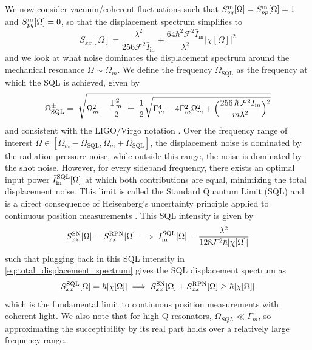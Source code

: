 We now consider vacuum/coherent fluctuations such that $S_{qq}^{\rm in}[\Omega]=S_{pp}^{\rm in}[\Omega]=1$ and $S_{pq}^{\rm in}[\Omega]=0$, so that the displacement spectrum simplifies to
\begin{equation}
  S_{xx}[\Omega] = \dfrac{\lambda^2}{256 \mathcal{F}^2 \bar{I}_\mathrm{in}} +  \dfrac{64 \hbar^2 \mathcal{F}^2 \bar{I}_\mathrm{in}}{\lambda^2}|\chi[\Omega]|^2 
  \label{eq:total_displacement_spectrum}
\end{equation}
and we look at what noise dominates the displacement spectrum around the mechanical resonance $\Omega \sim \Omega_m$. We define the frequency $\Omega_{\text{SQL}}$ as the frequency at which the SQL is achieved, given by
\begin{equation}
  \Omega^{\pm}_{\text{SQL}}  =\;\sqrt{\Omega_m^2-\dfrac{\Gamma_m^2}{2}
\;\pm\;\dfrac{1}{2}\sqrt{\Gamma_m^4-4\Gamma_m^2\Omega_m^2+\Big(\frac{256\,\hbar\,\mathcal F^2 I_{\rm in}}{m\lambda^2}\Big)^2}}
\end{equation}
and consistent with the LIGO/Virgo notation \cite{harry_advanced_2010, aasi_enhanced_2013}. Over the frequency range of interest $\Omega \in [\Omega_m - \Omega_{\text{SQL}}, \Omega_m + \Omega_{\text{SQL}}]$, the displacement noise is dominated by the radiation pressure noise, while outside this range, the noise is dominated by the shot noise. However, for every sideband frequency, there exists an optimal input power $\bar{I}_\mathrm{in}^{\rm SQL}[\Omega]$ at which both contributions are equal, minimizing the total displacement noise. This limit is called the Standard Quantum Limit (SQL) and is a direct consequence of Heisenberg's uncertainty principle applied to continuous position measurements \cite{braginsky_quantum_1992, clerk_introduction_2010}. This SQL intensity is given by
\begin{equation}
  S_{xx}^{\rm SN}[\Omega] = S_{xx}^{\rm RPN}[\Omega] \implies \bar{I}_\mathrm{in}^{\rm SQL}[\Omega] = \dfrac{\lambda^2}{128\mathcal{F}^2 \hbar |\chi[\Omega]|}
\end{equation}
such that plugging back in this SQL intensity in \eqref{eq:total_displacement_spectrum} gives the SQL displacement spectrum as
\begin{equation}
  S_{xx}^{\rm SQL}[\Omega] = \hbar |\chi[\Omega]| \implies S_{xx}^{\rm SN}[\Omega] + S_{xx}^{\rm RPN}[\Omega] \geq \hbar |\chi[\Omega]|
\end{equation}
which is the fundamental limit to continuous position measurements with coherent light. We also note that for high Q resonators, $\Omega_{SQL} \ll \Gamma_m$, so approximating the succeptibility by its real part holds over a relatively large frequency range.

